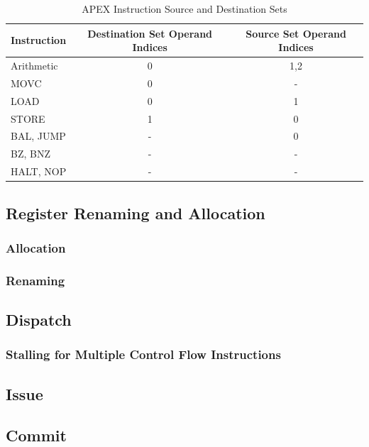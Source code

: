 \documentclass[12pt]{article}
\begin{document}
\begin{table}
  \centering
  \caption{APEX Instruction Source and Destination Sets}
  \label{tab:instsets}
  \begin{tabular}{l|c|c}
    Instruction & Destination Set Operand Indices & Source Set Operand Indices\\
    \hline
    Arithmetic					 	& 0 & 1,2\\
    MOVC 							& 0 & - \\
    LOAD							& 0 & 1 \\
    STORE							& 1 & 0 \\
    BAL, JUMP						& - & 0 \\
    BZ, BNZ 						& - & - \\
    HALT, NOP						& - & - \\
  \end{tabular}
\end{table}

\subsection{Register Renaming and Allocation}
\subsubsection{Allocation}
\subsubsection{Renaming}

\subsection{Dispatch}
\subsubsection{Stalling for Multiple Control Flow Instructions}

\subsection{Issue}

\subsection{Commit}
\end{document}
